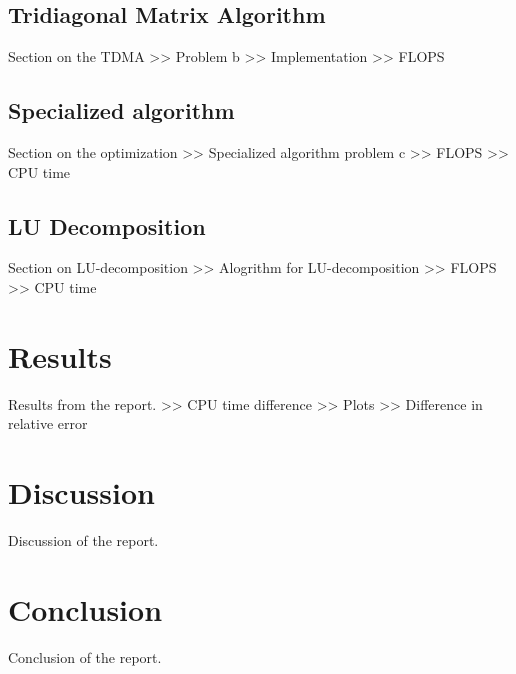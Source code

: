 \documentclass[10pt, a4paper]{amsart}
\begin{document}
\subsection{Tridiagonal Matrix Algorithm}
Section on the TDMA
>> Problem b >> Implementation >> FLOPS
\subsection{Specialized algorithm}
Section on the optimization
>> Specialized algorithm problem c >> FLOPS >> CPU time
\subsection{LU Decomposition}
Section on LU-decomposition
>> Alogrithm for LU-decomposition >> FLOPS >> CPU time

\section{Results}
Results from the report.
>> CPU time difference >> Plots >> Difference in relative error

\section{Discussion}
Discussion of the report.
\section{Conclusion}
Conclusion of the report.

\end{document}
